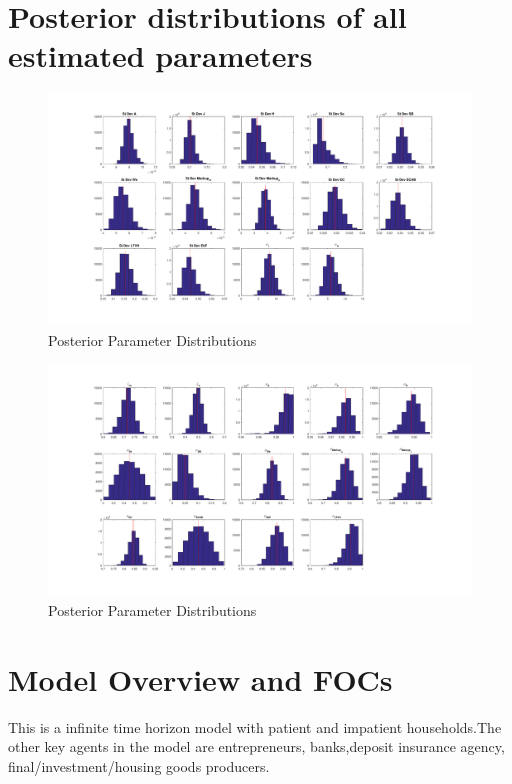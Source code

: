 \documentclass[12pt]{article}
\numberwithin{equation}{section}
\begin{document}
\begin{appendix}
\section{Posterior distributions of all estimated parameters}
\label{app_posteriorDist}

\begin{figure}[h]
\centering
\caption{Posterior Parameter Distributions}
\label{app_post1}
\includegraphics[scale=0.45]{posteriordistributions1.pdf}
\end{figure}

\begin{figure}[h]
\centering
\caption{Posterior Parameter Distributions}
\label{app_post2}
\includegraphics[scale=0.45]{posteriordistributions2.pdf}
\end{figure}

\FloatBarrier

\section{Model Overview and FOCs}
\label{app_modelOverview}
This is a infinite time horizon model with patient and impatient households.The other key agents in the model are entrepreneurs, banks,deposit insurance agency, final/investment/housing goods producers.


\end{appendix}
\end{document}
